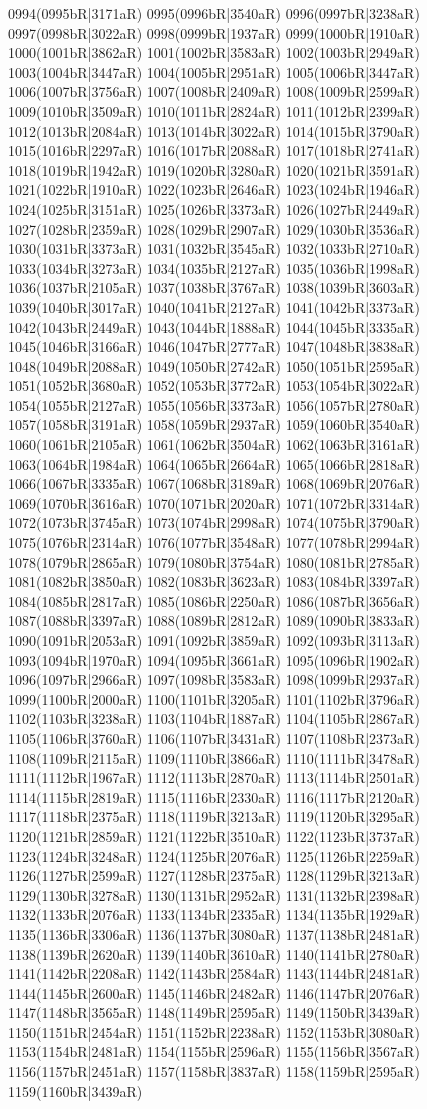 0994(0995bR|3171aR) 0995(0996bR|3540aR) 0996(0997bR|3238aR) 0997(0998bR|3022aR) 0998(0999bR|1937aR) 0999(1000bR|1910aR) 1000(1001bR|3862aR) 1001(1002bR|3583aR) 1002(1003bR|2949aR) 1003(1004bR|3447aR) 1004(1005bR|2951aR) 1005(1006bR|3447aR) 1006(1007bR|3756aR) 1007(1008bR|2409aR) 1008(1009bR|2599aR) 1009(1010bR|3509aR) 1010(1011bR|2824aR) 1011(1012bR|2399aR) 1012(1013bR|2084aR) 1013(1014bR|3022aR) 1014(1015bR|3790aR) 1015(1016bR|2297aR) 1016(1017bR|2088aR) 1017(1018bR|2741aR) 1018(1019bR|1942aR) 1019(1020bR|3280aR) 1020(1021bR|3591aR) 1021(1022bR|1910aR) 1022(1023bR|2646aR) 1023(1024bR|1946aR) 1024(1025bR|3151aR) 1025(1026bR|3373aR) 1026(1027bR|2449aR) 1027(1028bR|2359aR) 1028(1029bR|2907aR) 1029(1030bR|3536aR) 1030(1031bR|3373aR) 1031(1032bR|3545aR) 1032(1033bR|2710aR) 1033(1034bR|3273aR) 1034(1035bR|2127aR) 1035(1036bR|1998aR) 1036(1037bR|2105aR) 1037(1038bR|3767aR) 1038(1039bR|3603aR) 1039(1040bR|3017aR) 1040(1041bR|2127aR) 1041(1042bR|3373aR) 1042(1043bR|2449aR) 1043(1044bR|1888aR) 1044(1045bR|3335aR) 1045(1046bR|3166aR) 1046(1047bR|2777aR) 1047(1048bR|3838aR) 1048(1049bR|2088aR) 1049(1050bR|2742aR) 1050(1051bR|2595aR) 1051(1052bR|3680aR) 1052(1053bR|3772aR) 1053(1054bR|3022aR) 1054(1055bR|2127aR) 1055(1056bR|3373aR) 1056(1057bR|2780aR) 1057(1058bR|3191aR) 1058(1059bR|2937aR) 1059(1060bR|3540aR) 1060(1061bR|2105aR) 1061(1062bR|3504aR) 1062(1063bR|3161aR) 1063(1064bR|1984aR) 1064(1065bR|2664aR) 1065(1066bR|2818aR) 1066(1067bR|3335aR) 1067(1068bR|3189aR) 1068(1069bR|2076aR) 1069(1070bR|3616aR) 1070(1071bR|2020aR) 1071(1072bR|3314aR) 1072(1073bR|3745aR) 1073(1074bR|2998aR) 1074(1075bR|3790aR) 1075(1076bR|2314aR) 1076(1077bR|3548aR) 1077(1078bR|2994aR) 1078(1079bR|2865aR) 1079(1080bR|3754aR) 1080(1081bR|2785aR) 1081(1082bR|3850aR) 1082(1083bR|3623aR) 1083(1084bR|3397aR) 1084(1085bR|2817aR) 1085(1086bR|2250aR) 1086(1087bR|3656aR) 1087(1088bR|3397aR) 1088(1089bR|2812aR) 1089(1090bR|3833aR) 1090(1091bR|2053aR) 1091(1092bR|3859aR) 1092(1093bR|3113aR) 1093(1094bR|1970aR) 1094(1095bR|3661aR) 1095(1096bR|1902aR) 1096(1097bR|2966aR) 1097(1098bR|3583aR) 1098(1099bR|2937aR) 1099(1100bR|2000aR) 1100(1101bR|3205aR) 1101(1102bR|3796aR) 1102(1103bR|3238aR) 1103(1104bR|1887aR) 1104(1105bR|2867aR) 1105(1106bR|3760aR) 1106(1107bR|3431aR) 1107(1108bR|2373aR) 1108(1109bR|2115aR) 1109(1110bR|3866aR) 1110(1111bR|3478aR) 1111(1112bR|1967aR) 1112(1113bR|2870aR) 1113(1114bR|2501aR) 1114(1115bR|2819aR) 1115(1116bR|2330aR) 1116(1117bR|2120aR) 1117(1118bR|2375aR) 1118(1119bR|3213aR) 1119(1120bR|3295aR) 1120(1121bR|2859aR) 1121(1122bR|3510aR) 1122(1123bR|3737aR) 1123(1124bR|3248aR) 1124(1125bR|2076aR) 1125(1126bR|2259aR) 1126(1127bR|2599aR) 1127(1128bR|2375aR) 1128(1129bR|3213aR) 1129(1130bR|3278aR) 1130(1131bR|2952aR) 1131(1132bR|2398aR) 1132(1133bR|2076aR) 1133(1134bR|2335aR) 1134(1135bR|1929aR) 1135(1136bR|3306aR) 1136(1137bR|3080aR) 1137(1138bR|2481aR) 1138(1139bR|2620aR) 1139(1140bR|3610aR) 1140(1141bR|2780aR) 1141(1142bR|2208aR) 1142(1143bR|2584aR) 1143(1144bR|2481aR) 1144(1145bR|2600aR) 1145(1146bR|2482aR) 1146(1147bR|2076aR) 1147(1148bR|3565aR) 1148(1149bR|2595aR) 1149(1150bR|3439aR) 1150(1151bR|2454aR) 1151(1152bR|2238aR) 1152(1153bR|3080aR) 1153(1154bR|2481aR) 1154(1155bR|2596aR) 1155(1156bR|3567aR) 1156(1157bR|2451aR) 1157(1158bR|3837aR) 1158(1159bR|2595aR) 1159(1160bR|3439aR) 